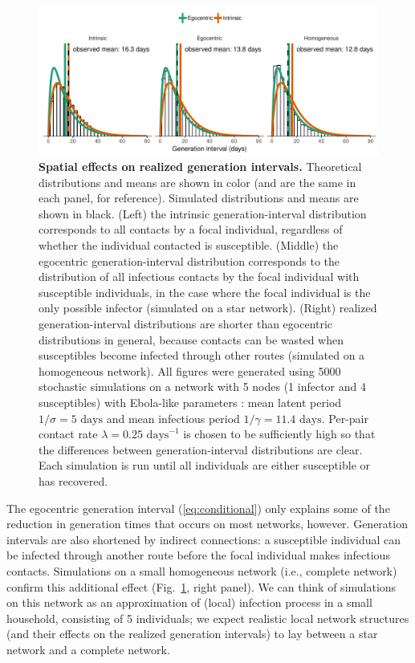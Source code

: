 \documentclass[12pt]{article}
\newcommand{\eref}[1]{(\ref{eq:#1})}
\newcommand{\fref}[1]{Fig.~\ref{fig:#1}}
\newcommand{\rev}[1]{}
\begin{document}
\begin{figure}[!pbth]
\includegraphics[width=\textwidth]{../fig/local_effect.pdf}
\caption{
\textbf{Spatial effects on realized generation intervals.}
Theoretical distributions and means are shown in color (and are the same in each panel, for reference). Simulated distributions and means are shown in black.
(Left) the intrinsic generation-interval distribution corresponds to all contacts by a focal individual, regardless of whether the individual contacted is susceptible.
(Middle) the egocentric generation-interval distribution corresponds to the distribution of all infectious contacts by the focal individual with susceptible individuals, in the case where the focal individual is the only possible infector (simulated on a star network).
(Right) realized generation-interval distributions are shorter than egocentric distributions in general, because contacts can be wasted when susceptibles become infected through other routes (simulated on a homogeneous network).
All figures were generated using 5000 stochastic simulations on a network with 5 nodes (1 infector and 4 susceptibles) with Ebola-like parameters \citep{who2014ebola}:
mean latent period $1/\sigma = 5 \textrm{ days}$ and mean infectious period $1/\gamma = 11.4 \textrm{ days}$. 
Per-pair contact rate $\lambda = 0.25 \textrm{ days}^{-1}$ is chosen to be sufficiently high so that the differences between generation-interval distributions are clear.
Each simulation is run until all individuals are either susceptible or has recovered.
}
\label{fig:local}
\end{figure}

\rev{
what is a homogeneous network? Complete network, alla have same degree or ...? Explain better why your networks of size 5 matter in a large community (local aspects?)
}
The egocentric generation interval \eref{conditional} only explains some of the reduction in generation times that occurs on most networks, however.
Generation intervals are also shortened by indirect connections: a susceptible individual can be infected through another route before the focal individual makes infectious contacts.
Simulations on a small homogeneous network (i.e., complete network) confirm this additional effect (\fref{local}, right panel). 
We can think of simulations on this network as an approximation of (local) infection process in a small household, consisting of 5 individuals;
we expect realistic local network structures (and their effects on the realized generation intervals) to lay between a star network and a complete network. 
\end{document}
